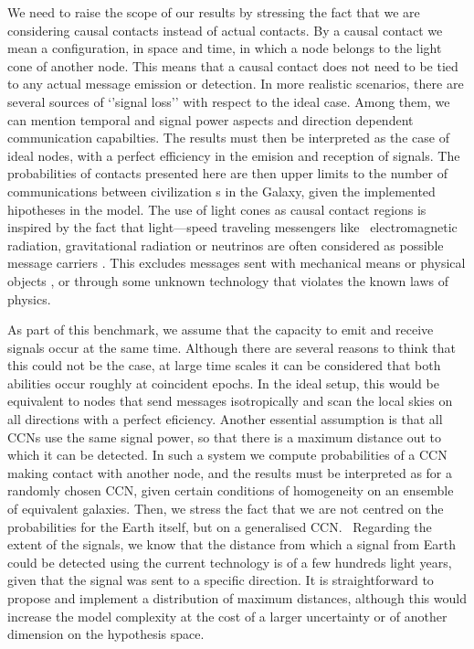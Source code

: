 \documentclass[crop]{CSLB}
\newcommand{\ceti}{CCN}
\newcommand{\cetis}{CCNs}
\begin{document}
We need to raise the scope of our results by stressing the fact that we are considering causal contacts instead of actual contacts.
%
By a causal contact we mean a configuration, in space and time, in which a node belongs to the light cone of another node.
%
This means that a causal contact does not need to be tied to any actual message emission or detection.
%
In more realistic scenarios, there are several sources of ‘’signal loss’’ with respect to the ideal case.
%
Among them, we can mention temporal and signal power aspects and direction dependent communication capabilties.
%
The results must then be interpreted as the case of ideal nodes, with a perfect efficiency in the emision and reception of signals.
%
The probabilities of contacts presented here are then upper limits to the number of communications between civilization s in the Galaxy, given the implemented hipotheses in the model.
%
The use of light cones as causal contact regions is inspired by the fact that light—speed traveling messengers like 
electromagnetic radiation, gravitational radiation or neutrinos are often considered as possible message carriers \citep{hippke_interstellar_2017, wright_how_2018}.
%
This excludes messages sent with mechanical means or physical objects \citep[e.g., ][]{Armstrong2013, barlow_galactic_2013}, or through some unknown technology that violates the known laws of physics.


As part of this benchmark, we assume that the capacity to emit and receive signals occur at the same time.
%
Although there are several reasons to think that this could not be the case, at large time scales it can be considered that both abilities occur roughly at coincident epochs.
%
In the ideal setup, this would be equivalent to nodes that send messages isotropically and scan the local skies on all directions with a perfect eficiency.
%
Another essential assumption is that all \cetis{} use the same signal power, so that there is a maximum distance out to which it can be detected.
%
%
In such a system we compute probabilities of a \ceti{} making contact with another node, and the results must be interpreted as for a randomly chosen \ceti{}, given certain conditions of homogeneity on an ensemble of equivalent galaxies.
%
Then, we stress the fact that we are not centred on the probabilities for the Earth itself, but on a generalised \ceti{}. 
%
Regarding the extent of the signals, we know that the distance from which a signal from Earth could be detected using the current technology is of a few hundreds light years, given that the signal was sent to a specific direction.
%
It is straightforward to propose and implement a distribution of maximum distances, although this would increase the model complexity at the cost of a larger uncertainty or of another dimension on the hypothesis space.    
\end{document}
